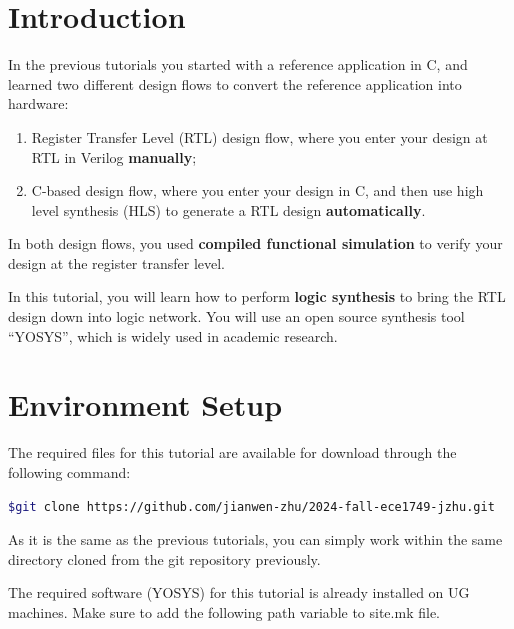 \documentclass[12pt]{article}
\newcommand{\quotes}[1]{``#1''}
\begin{document}
\pagebreak


\section{Introduction}

In the previous tutorials you started with a reference application in
C, and learned two different design flows to convert the reference
application into hardware:

\begin{enumerate}
\item Register Transfer Level (RTL) design flow, where you enter your
  design at RTL in Verilog {\bf manually};
  
\item C-based design flow, where you enter your design in C, and then
  use high level synthesis (HLS) to generate a RTL design {\bf
    automatically}.
\end{enumerate}

In both design flows, you used {\bf compiled functional simulation} to
verify your design at the register transfer level.

In this tutorial, you will learn how to perform {\bf logic synthesis}
to bring the RTL design down into logic network. You will use an open
source synthesis tool \quotes{YOSYS}, which is widely used in academic
research.

\section{Environment Setup}

The required files for this tutorial are available for download
through the following command:

\begin{lstlisting}[language=bash]
  $git clone https://github.com/jianwen-zhu/2024-fall-ece1749-jzhu.git
\end{lstlisting}

As it is the same as the previous tutorials, you can simply work
within the same directory cloned from the git repository previously.

The required software (YOSYS) for this tutorial is already installed
on UG machines. Make sure to add the following path variable to
{site.mk} file.
\end{document}
